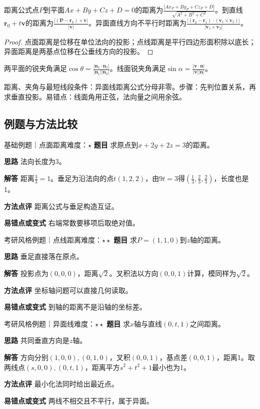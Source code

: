 \begin{theorem}{距离公式}点$P$到平面$Ax+By+Cz+D=0$的距离为$\frac{|Ax_P+By_P+Cz_P+D|}{\sqrt{A^2+B^2+C^2}}$。到直线$\bm r_0+t\bm v$的距离为$\frac{|(\bm P-\bm r_0)\times\bm v|}{|\bm v|}$。异面直线方向不平行时距离为$\frac{|(\bm r_2-\bm r_1)\cdot(\bm v_1\times\bm v_2)|}{|\bm v_1\times\bm v_2|}$。\end{theorem}
\begin{proof}点面距离是位移在单位法向的投影；点线距离是平行四边形面积除以底长；异面距离是两基点位移在公垂线方向的投影。\end{proof}
两平面的锐夹角满足$\cos\theta=\frac{|\bm n_1\cdot\bm n_2|}{|\bm n_1||\bm n_2|}$。线面锐夹角满足$\sin\alpha=\frac{|\bm v\cdot\bm n|}{|\bm v||\bm n|}$。

\begin{method}{距离、夹角与最短线段}条件：异面线距离公式分母非零。步骤：先判位置关系，再求垂直投影。易错点：线面角用正弦，法向量之间用余弦。\end{method}
\subsection{例题与方法比较}
\begin{example}{基础例题｜点面距离}{难度：$\star$}
\label{ex:5:10}\textbf{题目} 求原点到$x+2y+2z=3$的距离。\par
\textbf{思路} 法向长度为3。\par
\textbf{解答} 距离$\frac{3}{3}=1$。垂足为沿法向的点$t(1,2,2)$，由$9t=3$得$(\frac{1}{3},\frac{2}{3},\frac{2}{3})$，长度也是1。\par
\textbf{方法点评} 距离公式与垂足构造互证。\par
\textbf{易错点或变式} 右端常数要移项后取绝对值。
\end{example}
\begin{example}{考研风格例题｜点线距离}{难度：$\star\star$}
\label{ex:5:11}\textbf{题目} 求$P=(1,1,0)$到$z$轴的距离。\par
\textbf{思路} 垂足直接落在原点。\par
\textbf{解答} 投影点为$(0,0,0)$，距离$\sqrt2$。叉积法以方向$(0,0,1)$计算，模同样为$\sqrt2$。\par
\textbf{方法点评} 坐标轴问题可以直接几何读取。\par
\textbf{易错点或变式} 到轴的距离不是沿轴的坐标差。
\end{example}
\begin{example}{考研风格例题｜异面线}{难度：$\star\star$}
\label{ex:5:12}\textbf{题目} 求$x$轴与直线$(0,t,1)$之间距离。\par
\textbf{思路} 共同垂直方向是$z$轴。\par
\textbf{解答} 方向分别$(1,0,0),(0,1,0)$，叉积$(0,0,1)$，基点差$(0,0,1)$，距离1。取两线点$(s,0,0),(0,t,1)$，距离平方$s^2+t^2+1$最小也为1。\par
\textbf{方法点评} 最小化法同时给出最近点。\par
\textbf{易错点或变式} 两线不相交且不平行，属于异面。
\end{example}

